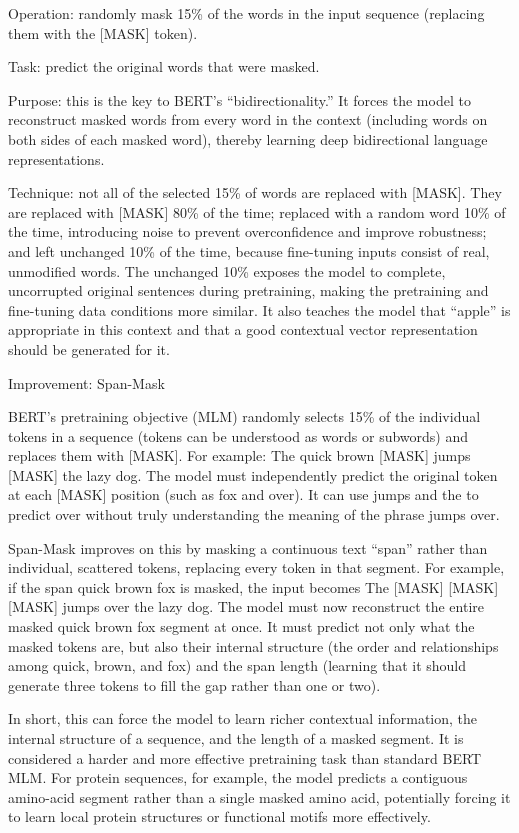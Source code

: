 Operation: randomly mask 15\% of the words in the input sequence (replacing them with the {[}MASK{]} token).

Task: predict the original words that were masked.

Purpose: this is the key to BERT's ``bidirectionality.'' It forces the model to reconstruct masked words from every word in the context (including words on both sides of each masked word), thereby learning deep bidirectional language representations.

Technique: not all of the selected 15\% of words are replaced with {[}MASK{]}. They are replaced with {[}MASK{]} 80\% of the time; replaced with a random word 10\% of the time, introducing noise to prevent overconfidence and improve robustness; and left unchanged 10\% of the time, because fine-tuning inputs consist of real, unmodified words. The unchanged 10\% exposes the model to complete, uncorrupted original sentences during pretraining, making the pretraining and fine-tuning data conditions more similar. It also teaches the model that ``apple'' is appropriate in this context and that a good contextual vector representation should be generated for it.

Improvement: Span-Mask

BERT's pretraining objective (MLM) randomly selects 15\% of the individual tokens in a sequence (tokens can be understood as words or subwords) and replaces them with {[}MASK{]}. For example: The quick brown {[}MASK{]} jumps {[}MASK{]} the lazy dog. The model must independently predict the original token at each {[}MASK{]} position (such as fox and over). It can use jumps and the to predict over without truly understanding the meaning of the phrase jumps over.

Span-Mask improves on this by masking a continuous text ``span'' rather than individual, scattered tokens, replacing every token in that segment. For example, if the span quick brown fox is masked, the input becomes The {[}MASK{]} {[}MASK{]} {[}MASK{]} jumps over the lazy dog. The model must now reconstruct the entire masked quick brown fox segment at once. It must predict not only what the masked tokens are, but also their internal structure (the order and relationships among quick, brown, and fox) and the span length (learning that it should generate three tokens to fill the gap rather than one or two).

In short, this can force the model to learn richer contextual information, the internal structure of a sequence, and the length of a masked segment. It is considered a harder and more effective pretraining task than standard BERT MLM. For protein sequences, for example, the model predicts a contiguous amino-acid segment rather than a single masked amino acid, potentially forcing it to learn local protein structures or functional motifs more effectively.

